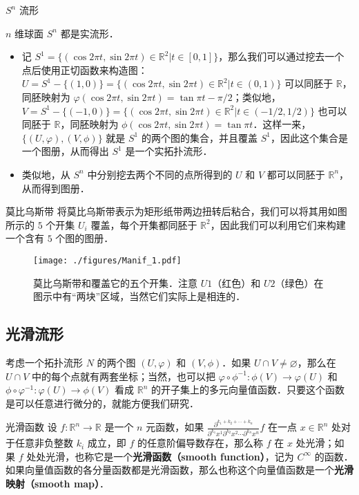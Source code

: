 \begin{example}{$S^n$ 流形}

$n$ 维球面 $S^n$ 都是实流形．
\begin{itemize}
\item 记 $S^1=\{(\cos{2\pi t},\sin{2\pi t})\in\mathbb{R}^2|t\in[0, 1]\}$，那么我们可以通过挖去一个点后使用正切函数来构造图：$U=S^1-\{(1,0)\}=\{(\cos{2\pi t},\sin{2\pi t})\in\mathbb{R}^2|t\in(0, 1)\}$ 可以同胚于 $\mathbb{R}$，同胚映射为 $\varphi(\cos{2\pi t},\sin{2\pi t})=\tan{\pi t-\pi/2}$；类似地，$V=S^1-\{(-1, 0)\}=\{(\cos{2\pi t},\sin{2\pi t})\in\mathbb{R}^2|t\in(-1/2, 1/2)\}$ 也可以同胚于 $\mathbb{R}$，同胚映射为 $\phi(\cos{2\pi t},\sin{2\pi t})= \tan{\pi t}$．这样一来，$\{(U, \varphi), (V, \phi)\}$ 就是 $S^1$ 的两个图的集合，并且覆盖 $S^1$，因此这个集合是一个图册，从而得出 $S^1$ 是一个实拓扑流形．
\item 类似地，从 $S^n$ 中分别挖去两个不同的点所得到的 $U$ 和 $V$ 都可以同胚于 $\mathbb{R}^n$，从而得到图册．


\end{itemize}

\end{example}

\begin{example}{莫比乌斯带}
将莫比乌斯带表示为矩形纸带两边扭转后粘合，我们可以将其用如图所示的 $5$ 个开集 $U_i$ 覆盖，每个开集都同胚于 $\mathbb{R}^2$，因此我们可以利用它们来构建一个含有 $5$ 个图的图册．
\begin{figure}[ht]
\centering
\texttt{[image: ./figures/Manif\_1.pdf]}
\caption{莫比乌斯带和覆盖它的五个开集．注意 $U1$（红色）和 $U2$（绿色）在图示中有“两块”区域，当然它们实际上是相连的．} \label{Manif_fig1}
\end{figure}
\end{example}

\subsection{光滑流形}

考虑一个拓扑流形 $N$ 的两个图 $(U, \varphi)$ 和 $(V, \phi)$．如果 $U\cap V\not=\varnothing$，那么在 $U\cap V$ 中的每个点就有两套坐标；当然，也可以把 $\varphi\circ\phi^{-1}:\phi(V)\rightarrow\varphi(U)$ 和 $\phi\circ\varphi^{-1}:\varphi(U)\rightarrow\phi(V)$ 看成 $\mathbb{R}^n$ 的开子集上的多元向量值函数．只要这个函数是可以任意进行微分的，就能方便我们研究．

\begin{definition}{光滑函数}
设 $f:\mathbb{R}^n\rightarrow\mathbb{R}$ 是一个 $n$ 元函数，如果 $\frac{\partial^{k_1+k_2+\cdots+k_n}}{\partial^{k_1}x^1\partial^{k_2}x^2\cdots\partial^{k_n}x^n} f$ 在一点 $x\in\mathbb{R}^n$ 处对于任意非负整数 $k_i$ 成立，即 $f$ 的任意阶偏导数存在，那么称 $f$ 在 $x$ 处光滑；如果 $f$ 处处光滑，也称它是一个\textbf{光滑函数（smooth function）}，记为 $C^\infty$ 的函数．如果向量值函数的各分量函数都是光滑函数，那么也称这个向量值函数是一个\textbf{光滑映射（smooth map）}．
\end{definition}

